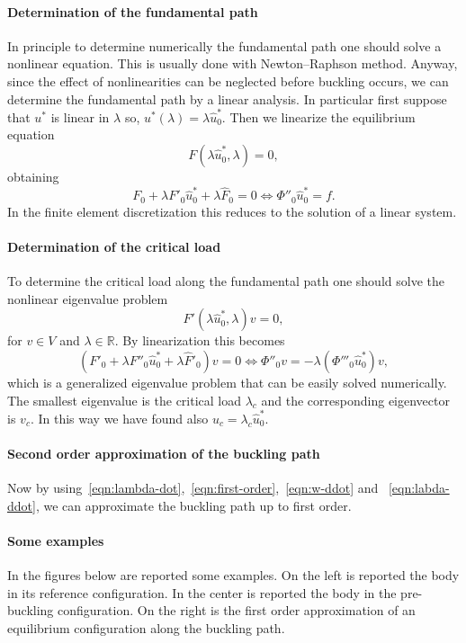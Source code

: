 \documentclass[a4paper,11pt]{article}
\theoremstyle{definition}
\begin{document}
\paragraph{Determination of the fundamental path} In principle to determine numerically the fundamental path one should solve a nonlinear equation. This is usually done with Newton--Raphson method. Anyway, since the effect of nonlinearities can be neglected before buckling occurs, we can determine the fundamental path by a linear analysis. In particular first suppose that $u^*$ is linear in $\lambda$ so, $u^*(\lambda)=\lambda\hat u^*_0$. Then we linearize the equilibrium equation
\[
F(\lambda\hat u^*_0,\lambda)=0,
\]
obtaining
\[
F_0+\lambda F'_0\hat u^*_0+\lambda\hat F_0=0\iff \Phi''_0\hat u^*_0=f.
\]
In the finite element discretization this reduces to the solution of a linear system.

\paragraph{Determination of the critical load} To determine the critical load along the fundamental path one should solve the nonlinear eigenvalue problem
\[
F'(\lambda\hat u^*_0,\lambda)v=0,
\]
for $v\in V$ and $\lambda\in\mathbb{R}$. By linearization this becomes
\[
(F'_0+\lambda F''_0\hat u^*_0+\lambda\hat F'_0)v=0\iff\Phi''_0v=-\lambda(\Phi'''_0\hat u^*_0)v,
\]
which is a generalized eigenvalue problem that can be easily solved numerically. The smallest eigenvalue is the critical load $\lambda_c$ and the corresponding eigenvector is $v_c$. In this way we have found also $u_c=\lambda_c\hat u^*_0$.

\paragraph{Second order approximation of the buckling path} Now by using~\eqref{eqn:lambda-dot},~\eqref{eqn:first-order},~\eqref{eqn:w-ddot} and ~\eqref{eqn:labda-ddot}, we can approximate the buckling path up to first order.

\paragraph{Some examples} In the figures below are reported some examples. On the left is reported the body in its reference configuration. In the center is reported the body in the pre-buckling configuration. On the right is the first order approximation of an equilibrium configuration along the buckling path.
\end{document}
